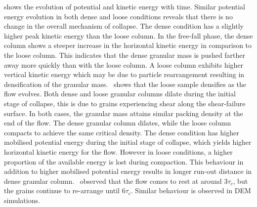  shows the evolution of potential and kinetic 
energy with time. Similar potential energy evolution in both dense and loose 
conditions reveals that there is no change in the overall mechanism of 
collapse. The dense condition has a slightly higher peak kinetic energy than 
the loose column. In the free-fall phase, the dense column shows a steeper 
increase in the horizontal kinetic energy in comparison to the loose column. 
This indicates that the dense granular mass is pushed farther away more quickly 
than with the loose column. A loose column exhibits higher vertical kinetic 
energy which may be due to particle rearrangement resulting in densification of 
the granular mass.~ shows that the loose sample densifies as 
the flow evolves. Both dense and loose granular columns dilate during the 
initial stage of collapse, this is due to grains experiencing shear along the 
shear-failure surface. In both cases, the granular mass attains similar packing 
density at the end of the flow. The dense granular column dilates, while the 
loose column compacts to achieve the same critical density. The dense condition 
has higher mobilised potential energy during the initial stage of collapse, 
which yields higher horizontal kinetic energy for the flow. However in loose 
conditions, a higher proportion of the available energy is lost during 
compaction. This behaviour in addition to higher mobilised potential energy 
results in longer run-out distance in dense granular 
column.~\citet{Lajeunesse2004} observed that the flow comes to rest at around 
$3\tau_c$, but the grains continue to re-arrange until $6\tau_c$. Similar 
behaviour is observed in DEM simulations.

